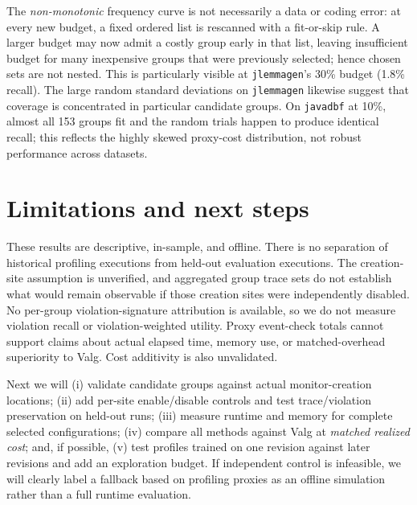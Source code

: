 \documentclass[10pt,letterpaper]{article}
\begin{document}
The \emph{non-monotonic} frequency curve is not necessarily a data or coding error: at every new budget, a fixed ordered list is rescanned with a fit-or-skip rule. A larger budget may now admit a costly group early in that list, leaving insufficient budget for many inexpensive groups that were previously selected; hence chosen sets are not nested. This is particularly visible at \texttt{jlemmagen}'s 30\% budget (1.8\% recall). The large random standard deviations on \texttt{jlemmagen} likewise suggest that coverage is concentrated in particular candidate groups. On \texttt{javadbf} at 10\%, almost all 153 groups fit and the random trials happen to produce identical recall; this reflects the highly skewed proxy-cost distribution, not robust performance across datasets.
\section{Limitations and next steps}
These results are descriptive, in-sample, and offline. There is no separation of historical profiling executions from held-out evaluation executions. The creation-site assumption is unverified, and aggregated group trace sets do not establish what would remain observable if those creation sites were independently disabled. No per-group violation-signature attribution is available, so we do not measure violation recall or violation-weighted utility. Proxy event-check totals cannot support claims about actual elapsed time, memory use, or matched-overhead superiority to Valg. Cost additivity is also unvalidated.

Next we will (i) validate candidate groups against actual monitor-creation locations; (ii) add per-site enable/disable controls and test trace/violation preservation on held-out runs; (iii) measure runtime and memory for complete selected configurations; (iv) compare all methods against Valg at \emph{matched realized cost}; and, if possible, (v) test profiles trained on one revision against later revisions and add an exploration budget. If independent control is infeasible, we will clearly label a fallback based on profiling proxies as an offline simulation rather than a full runtime evaluation.
\end{document}
